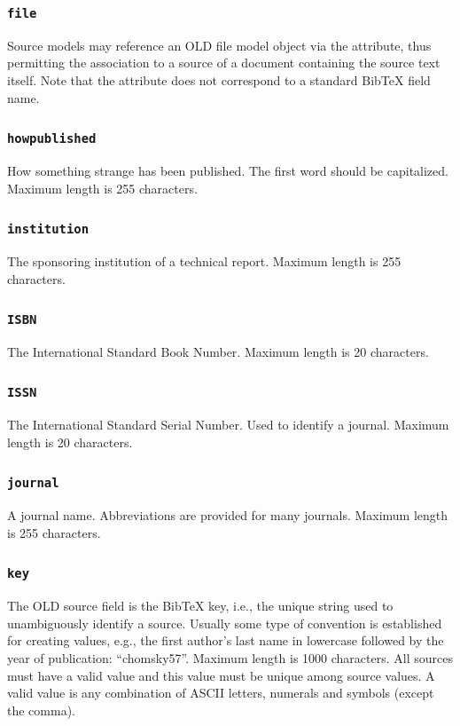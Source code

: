 \documentclass[letterpaper,10pt,english]{sphinxmanual}
\begin{document}
\subsubsection{\texttt{file}}
\label{datastructure:id42}
Source models may reference an OLD file model object via the  attribute,
thus permitting the association to a source of a document containing the source
text itself.  Note that the  attribute does not correspond to a standard
BibTeX field name.


\subsubsection{\texttt{howpublished}}
\label{datastructure:howpublished}
How something strange has been published. The first word should be capitalized.
Maximum length is 255 characters.


\subsubsection{\texttt{institution}}
\label{datastructure:institution}
The sponsoring institution of a technical report.  Maximum length is 255
characters.


\subsubsection{\texttt{ISBN}}
\label{datastructure:isbn}
The International Standard Book Number.  Maximum length is 20 characters.


\subsubsection{\texttt{ISSN}}
\label{datastructure:issn}
The International Standard Serial Number. Used to identify a journal.  Maximum
length is 20 characters.


\subsubsection{\texttt{journal}}
\label{datastructure:journal}
A journal name. Abbreviations are provided for many journals.  Maximum length is
255 characters.


\subsubsection{\texttt{key}}
\label{datastructure:key}
The OLD source  field is the BibTeX key, i.e., the unique string used to
unambiguously identify a source.  Usually some type of convention is established
for creating  values, e.g., the first author's last name in lowercase
followed by the year of publication: ``chomsky57''.  Maximum length is 1000
characters.  All sources must have a valid  value and this value must be
unique among source  values.  A valid  value is any combination of
ASCII letters, numerals and symbols (except the comma).
\end{document}
